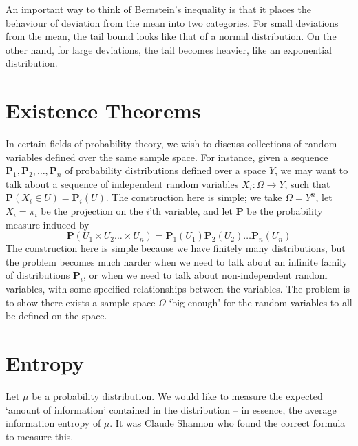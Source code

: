 An important way to think of Bernstein's inequality is that it places the behaviour of deviation from the mean into two categories. For small deviations from the mean, the tail bound looks like that of a normal distribution. On the other hand, for large deviations, the tail becomes heavier, like an exponential distribution.













\chapter{Existence Theorems}

In certain fields of probability theory, we wish to discuss collections of random variables defined over the same sample space. For instance, given a sequence $\mathbf{P}_1, \mathbf{P}_2, \dots, \mathbf{P}_n$ of probability distributions defined over a space $Y$, we may want to talk about a sequence of independent random variables $X_i: \Omega \to Y$, such that $\mathbf{P}(X_i \in U) = \mathbf{P}_i(U)$. The construction here is simple; we take $\Omega = Y^n$, let $X_i = \pi_i$ be the projection on the $i$'th variable, and let $\mathbf{P}$ be the probability measure induced by
%
\[ \mathbf{P}(U_1 \times U_2 \dots \times U_n) = \mathbf{P}_1(U_1) \mathbf{P}_2(U_2) \dots \mathbf{P}_n(U_n) \]
%
The construction here is simple because we have finitely many distributions, but the problem becomes much harder when we need to talk about an infinite family of distributions $\mathbf{P}_i$, or when we need to talk about non-independent random variables, with some specified relationships between the variables. The problem is to show there exists a sample space $\Omega$ `big enough' for the random variables to all be defined on the space.

\chapter{Entropy}

Let $\mu$ be a probability distribution. We would like to measure the expected `amount of information' contained in the distribution -- in essence, the average information entropy of $\mu$. It was Claude Shannon who found the correct formula to measure this.

